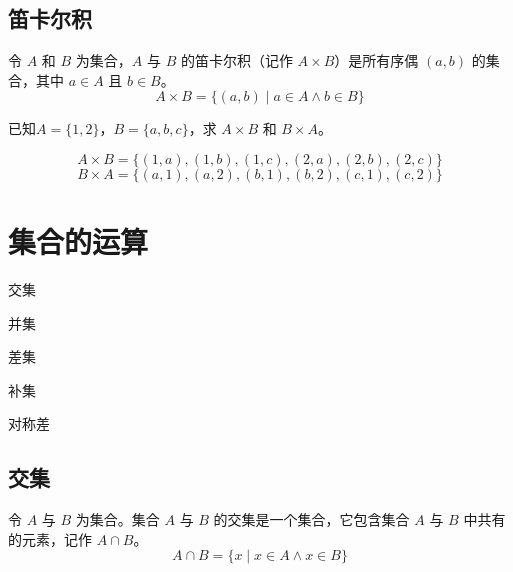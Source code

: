 \documentclass[lang=cn, chinesefont=founder, color=cyan, citestyle=gb7714-2015, bibstyle=gb7714-2015]{elegantbook}
\begin{document}
\subsection{笛卡尔积}
\begin{definition}[笛卡尔积]\label{def:笛卡尔积}
    令 $A$ 和 $B$ 为集合，$A$ 与 $B$ 的笛卡尔积（记作 $A \times B$）是所有序偶 $(a,b)$ 的集合，其中 $a \in A$ 且 $b \in B$。
    \begin{equation*}
        A \times B = \{(a,b) \mid a \in A \land b \in B \}
    \end{equation*}
\end{definition}

\begin{collections}
    \begin{example}
        已知$A = \{1, 2\}$，$B = \{a, b, c\}$，求 $A \times B$ 和 $B \times A$。
    \end{example}
    \begin{solution}
        $$A \times B = \{(1, a), (1, b), (1, c), (2, a), (2, b), (2, c)\}$$
        $$B \times A = \{(a, 1), (a, 2), (b, 1), (b, 2), (c, 1), (c, 2)\}$$
    \end{solution}
\end{collections}

\section{集合的运算}
\begin{introduction}
    \item 交集
    \item 并集
    \item 差集
    \item 补集
    \item 对称差
\end{introduction}

\subsection{交集}
\begin{definition}[集合的交集]\label{def:交集}
    令 $A$ 与 $B$ 为集合。集合 $A$ 与 $B$ 的交集是一个集合，它包含集合 $A$ 与 $B$ 中共有的元素，记作 $A \cap B$。
    \begin{equation*}
        A \cap B = \{x \mid x \in A \land x \in B \}
    \end{equation*}
\end{definition}
\end{document}
